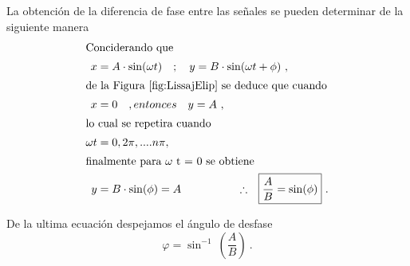       La obtención de la diferencia de fase entre las señales se pueden determinar de la
      siguiente manera
      \begin{align}
         \intertext{Conciderando que}
         x &= A\cdot \sin(\omega t) \hspace{10pt} ; \hspace{10pt} y = B\cdot \sin(\omega t + \phi) \ , \notag \\ 
         \intertext{de la Figura \ref{fig:LissajElip} se deduce que cuando}
         x &= 0 \hspace{10pt} , entonces \hspace{10pt} y = A \ , \notag \\
         \intertext{lo cual se repetira cuando}
         \omega t &= 0, 2\pi, .... n\pi, \notag \\
         \intertext{finalmente para \( \omega \) t = 0 se obtiene}
         y &= B\cdot \sin(\phi) = A \hspace{50pt} \therefore \Aboxed{\dfrac{A}{B} = \sin(\phi)} \ . \notag 
      \end{align}
      
      \noindent De la ultima ecuación despejamos el ángulo de desfase
      \begin{equation}
         \boxed{\varphi = \sin^{-1}\ \left(\dfrac{A}{B} \right)}   \ . \label{eqn:AngDeDesf}   
      \end{equation}

